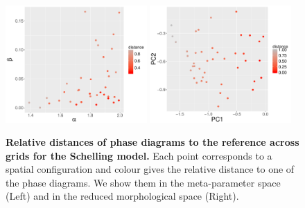 \documentclass[3p,times,procedia]{elsarticle}
\begin{document}
\begin{figure}[h!]
\centering
\includegraphics[width=0.48\textwidth]{figures/schelling-relativedistance_metaparams_red}
\includegraphics[width=0.48\textwidth]{figures/schelling-relativedistance_morphspace_red}
\caption{\textbf{Relative distances of phase diagrams to the reference across grids for the Schelling model.} Each point corresponds to a spatial configuration and colour gives the relative distance to one of the phase diagrams. We show them in the meta-parameter space (Left) and in the reduced morphological space (Right).\label{fig:schelling-distance-meta}}
\end{figure}
\end{document}
